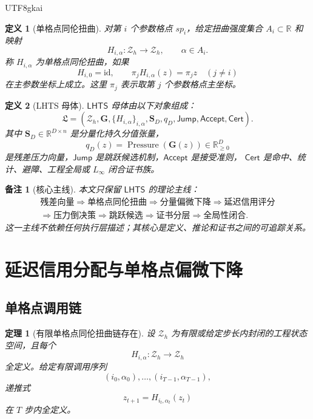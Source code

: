 \documentclass[12pt]{article}
\newtheorem{definition}{定义}[section]
\newtheorem{theorem}{定理}[section]
\newtheorem{remark}{备注}[section]
\newcommand{\RR}{\mathbb{R}}
\newcommand{\LHTS}{\ensuremath{\mathsf{LHTS}}}
\newcommand{\Cert}{\ensuremath{\mathsf{Cert}}}
\newcommand{\Jump}{\ensuremath{\mathsf{Jump}}}
\newcommand{\Accept}{\ensuremath{\mathsf{Accept}}}
\newcommand{\Linfty}{\ensuremath{L_\infty}}
\newcommand{\id}{\mathrm{id}}
\DeclareMathOperator{\Pressure}{Pressure}
\begin{document}
\begin{CJK*}{UTF8}{gkai}
\begin{definition}[单格点同伦扭曲]
\label{def:lhts-single-twist}
对第 \(i\) 个参数格点 \(sp_i\)，给定扭曲强度集合 \(A_i\subset\RR\) 和映射
\[
  H_{i,\alpha}:\mathcal Z_h\to\mathcal Z_h,
  \qquad
  \alpha\in A_i .
\]
称 \(H_{i,\alpha}\) 为单格点同伦扭曲，如果
\[
  H_{i,0}=\id,
  \qquad
  \pi_jH_{i,\alpha}(z)=\pi_j z
  \quad (j\ne i)
\]
在主参数坐标上成立。这里 \(\pi_j\) 表示取第 \(j\) 个参数格点主坐标。
\end{definition}

\begin{definition}[LHTS 母体]
\label{def:lhts-family}
\LHTS{} 母体由以下对象组成：
\[
  \mathfrak L
  =
  \left(
  \mathcal Z_h,
  \mathbf G,
  \{H_{i,\alpha}\}_{i,\alpha},
  \mathbf S_D,
  q_D,
  \Jump,
  \Accept,
  \Cert
  \right).
\]
其中 \(\mathbf S_D\in\RR^{D\times n}\) 是分量化持久分值张量，
\[
  q_D(z)=\Pressure(\mathbf G(z))\in\RR_{\ge0}^{D}
\]
是残差压力向量，\(\Jump\) 是跳跃候选机制，\(\Accept\) 是接受准则，
\(\Cert\) 是命中、统计、避障、工程全局或 \(\Linfty\) 闭合证书族。
\end{definition}

\begin{remark}[核心主线]
本文只保留 \LHTS{} 的理论主线：
\[
\boxed{
\begin{gathered}
\text{残差向量}
\Rightarrow
\text{单格点同伦扭曲}
\Rightarrow
\text{分量偏微下降}
\Rightarrow
\text{延迟信用评分}\\
\Rightarrow
\text{压力倒决策}
\Rightarrow
\text{跳跃候选}
\Rightarrow
\text{证书分层}
\Rightarrow
\text{全局性闭合}.
\end{gathered}
}
\]
这一主线不依赖任何执行层描述；其核心是定义、推论和证书之间的可追踪关系。
\end{remark}

\section{延迟信用分配与单格点偏微下降}
\label{sec:lhts-delayed-credit}

\subsection{单格点调用链}
\label{subsec:lhts-single-chain}

\begin{theorem}[有限单格点同伦扭曲链存在]
\label{thm:lhts-finite-chain}
设 \(\mathcal Z_h\) 为有限或给定步长内封闭的工程状态空间，且每个
\[
  H_{i,\alpha}:\mathcal Z_h\to\mathcal Z_h
\]
全定义。给定有限调用序列
\[
  (i_0,\alpha_0),\ldots,(i_{T-1},\alpha_{T-1}),
\]
递推式
\[
  z_{t+1}=H_{i_t,\alpha_t}(z_t)
\]
在 \(T\) 步内全定义。
\end{theorem}


\end{CJK*}
\end{document}
